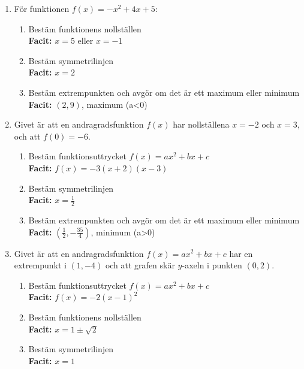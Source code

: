 \documentclass[a4paper,11pt]{article}
\begin{document}
\begin{enumerate}[label=\textbf{\arabic*.}]
    \item För funktionen $f(x) = -x^2 + 4x + 5$:
    \begin{enumerate}[label=\alph*)]
        \item Bestäm funktionens nollställen
        \\ \textbf{Facit:} $x=5$ eller $x=-1$
        \item Bestäm symmetrilinjen
        \\ \textbf{Facit:} $x=2$
        \item Bestäm extrempunkten och avgör om det är ett maximum eller minimum
        \\ \textbf{Facit:} $(2,9)$, maximum (a<0)
    \end{enumerate}
    
    \item Givet är att en andragradsfunktion $f(x)$ har nollställena $x = -2$ och $x = 3$, och att $f(0) = -6$.
    \begin{enumerate}[label=\alph*)]
        \item Bestäm funktionsuttrycket $f(x) = ax^2 + bx + c$
        \\ \textbf{Facit:} $f(x) = -3(x+2)(x-3)$
        \item Bestäm symmetrilinjen
        \\ \textbf{Facit:} $x=\frac{1}{2}$
        \item Bestäm extrempunkten och avgör om det är ett maximum eller minimum
        \\ \textbf{Facit:} $(\frac{1}{2}, -\frac{35}{4})$, minimum (a>0)
    \end{enumerate}
    
    \item Givet är att en andragradsfunktion $f(x) = ax^2 + bx + c$ har en extrempunkt i $(1, -4)$ och att grafen skär $y$-axeln i punkten $(0, 2)$.
    \begin{enumerate}[label=\alph*)]
        \item Bestäm funktionsuttrycket $f(x) = ax^2 + bx + c$
        \\ \textbf{Facit:} $f(x) = -2(x-1)^2$
        \item Bestäm funktionens nollställen
        \\ \textbf{Facit:} $x=1 \pm \sqrt{2}$
        \item Bestäm symmetrilinjen
        \\ \textbf{Facit:} $x=1$
    \end{enumerate}
\end{enumerate}
\end{document}
